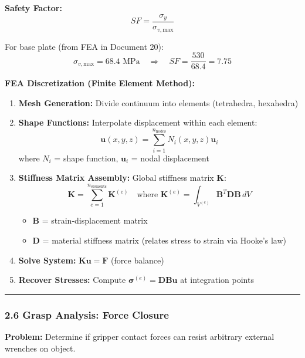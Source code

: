 \documentclass[
]{article}
\providecommand{\tightlist}{%
  \setlength{\itemsep}{0pt}\setlength{\parskip}{0pt}}
\begin{document}
\textbf{Safety Factor:} \[
SF = \frac{\sigma_y}{\sigma_{v,\text{max}}}
\]

For base plate (from FEA in Document 20): \[
\sigma_{v,\text{max}} = 68.4 \text{ MPa} \quad \Rightarrow \quad SF = \frac{530}{68.4} = 7.75
\]

\textbf{FEA Discretization (Finite Element Method):}

\begin{enumerate}
\def\labelenumi{\arabic{enumi}.}
\item
  \textbf{Mesh Generation:} Divide continuum into elements (tetrahedra,
  hexahedra)
\item
  \textbf{Shape Functions:} Interpolate displacement within each
  element: \[
  \mathbf{u}(x,y,z) = \sum_{i=1}^{n_{\text{nodes}}} N_i(x,y,z) \mathbf{u}_i
  \] where \(N_i\) = shape function, \(\mathbf{u}_i\) = nodal
  displacement
\item
  \textbf{Stiffness Matrix Assembly:} Global stiffness matrix
  \(\mathbf{K}\): \[
  \mathbf{K} = \sum_{e=1}^{n_{\text{elements}}} \mathbf{K}^{(e)} \quad \text{where } \mathbf{K}^{(e)} = \int_{V^{(e)}} \mathbf{B}^T \mathbf{D} \mathbf{B} \, dV
  \]

  \begin{itemize}
  \tightlist
  \item
    \(\mathbf{B}\) = strain-displacement matrix
  \item
    \(\mathbf{D}\) = material stiffness matrix (relates stress to strain
    via Hooke's law)
  \end{itemize}
\item
  \textbf{Solve System:} \(\mathbf{K} \mathbf{u} = \mathbf{F}\) (force
  balance)
\item
  \textbf{Recover Stresses:} Compute
  \(\boldsymbol{\sigma}^{(e)} = \mathbf{D} \mathbf{B} \mathbf{u}\) at
  integration points
\end{enumerate}

\begin{center}\rule{0.5\linewidth}{0.5pt}\end{center}

\hypertarget{grasp-analysis-force-closure}{%
\subsubsection{2.6 Grasp Analysis: Force
Closure}\label{grasp-analysis-force-closure}}

\textbf{Problem:} Determine if gripper contact forces can resist
arbitrary external wrenches on object.
\end{document}
